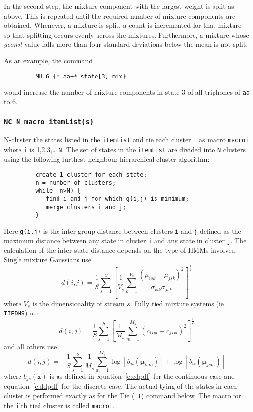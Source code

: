 In the second step, the mixture component with the largest
weight is split as above.  This is repeated until the required
number of mixture components are obtained.
Whenever, a mixture is split, a count is incremented  for that mixture
so that splitting occurs evenly across the mixtures.  Furthermore,
a mixture whose {\it gconst} value falls more than four standard
deviations below the mean is not split.

As an example, the command
\begin{verbatim}
         MU 6 {*-aa+*.state[3].mix}
\end{verbatim}
would increase the number of mixture components in state 3
of all triphones of \texttt{aa} to 6.

\subsubsection*{\tt NC N macro itemList(s)}

N-cluster the states listed in the 
\texttt{itemList} and tie each cluster \texttt{i} as macro \texttt{macroi}
where \texttt{i} is 1,2,3,\ldots,\texttt{N}.
The set of states in the \texttt{itemList} are divided into \texttt{N}
clusters using the following furthest neighbour hierarchical
cluster algorithm:
\begin{verbatim}
         create 1 cluster for each state;
         n = number of clusters;
         while (n>N) {
            find i and j for which g(i,j) is minimum;
            merge clusters i and j;
         }
\end{verbatim}
Here \texttt{g(i,j)} is the inter-group distance between
clusters \texttt{i} and \texttt{j} defined as the maximum
distance between any state in cluster \texttt{i} and any state
in cluster \texttt{j}.  The calculation of the inter-state
distance depends on the type of HMMs involved.  Single
mixture Gaussians use
\begin{equation}
  d(i,j) = \frac{1}{S} \sum_{s=1}^S
        \left[  
           \frac{1}{V_s} \sum_{k=1}^{V_s}
                 \frac{({\mu}_{isk} - {\mu}_{jsk})^2}{
                         {\sigma}_{isk}{\sigma}_{jsk}}
        \right]^{\frac{1}{2}}
\end{equation}
where $V_s$ is the dimensionality of stream $s$.  Fully tied
mixture systems (ie \texttt{TIEDHS}) use
\begin{equation}
  d(i,j) = \frac{1}{S} \sum_{s=1}^S
        \left[  
           \frac{1}{M_s} \sum_{m=1}^{M_s}
                (c_{ism} - c_{jsm})^2
        \right]^{\frac{1}{2}}
\end{equation}
and all others use
\begin{equation}
  d(i,j) = - \frac{1}{S} \sum_{s=1}^S
         \frac{1}{M_s} \sum_{m=1}^{M_s}
          \log[b_{js}(\bm{\mu}_{ism})] + \log[b_{is}(\bm{\mu}_{jsm})]
\end{equation}
where $b_{js}(\bm{x})$ is as defined in equation~\ref{e:cdpdf} for
the continuous case and equation~\ref{e:ddpdf} for the discrete case.  The actual
tying of the states in each cluster is performed exactly as for
the Tie (\texttt{TI}) command below.  The macro for the \texttt{i}'th
tied cluster is called \texttt{macroi}.

